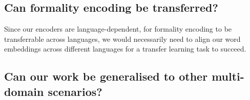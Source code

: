 \documentclass[11pt]{article}
\begin{document}
\subsection{Can formality encoding be transferred?}

Since our encoders are language-dependent, for formality encoding to be transferrable across languages, we would necessarily need to align our word embeddings across different languages for a transfer learning task to succeed. 

\subsection{Can our work be generalised to other multi-domain scenarios?}



\newpage
\printbibliography
\end{document}
